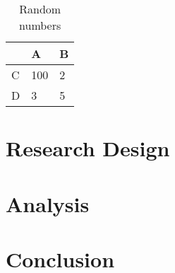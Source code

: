 \documentclass[11pt, a4paper]{article} %
\begin{document}
\begin{table}[] %
    \centering
\begin{tabular}{@{}lll@{}}
\toprule
  & A   & B \\ \midrule
C & 100 & 2 \\
D & 3   & 5 \\ \bottomrule
\end{tabular}
    \caption{Random numbers} %
    \label{tab:numbers} %
\end{table}


\section{Research Design}

\blindtext %


\section{Analysis}

\blindtext %


\section{Conclusion}

\blindtext %

\newpage %

%
\end{document}
